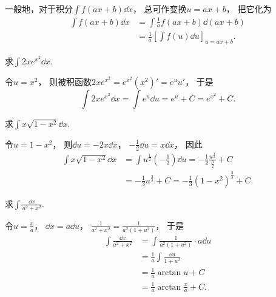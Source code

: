 \begin{remark}
一般地，对于积分\(\int f(ax+b) \dd{x}\)，
总可作变换\(u=ax+b\)，
把它化为\begin{align*}
	\int f(ax+b) \dd{x}
	&= \int \frac{1}{a} f(ax+b) \dd(ax+b) \\
	&= \frac{1}{a} \left[ \int f(u) \dd{u} \right]_{u=ax+b}.
\end{align*}
\end{remark}

\begin{example}
求\(\int 2x e^{x^2} \dd{x}\).
\begin{solution}
令\(u=x^2\)，
则被积函数\(2x e^{x^2} = e^{x^2} (x^2)' = e^u u'\)，
于是\begin{equation*}
	\int 2x e^{x^2} \dd{x}
	= \int e^u \dd{u}
	= e^u + C
	= e^{x^2} + C.
\end{equation*}
\end{solution}
\end{example}

\begin{example}
求\(\int x \sqrt{1-x^2} \dd{x}\).
\begin{solution}
令\(u=1-x^2\)，
则\(\dd{u} = -2x\dd{x}\)，
\(-\frac{1}{2}\dd{u} = x\dd{x}\)，
因此\begin{align*}
	\int x \sqrt{1-x^2} \dd{x}
	&= \int u^{\frac{1}{2}} \left(-\frac{1}{2}\right) \dd{u}
	= -\frac{1}{2} \frac{u^{\frac{3}{2}}}{\frac{3}{2}} + C \\
	&= -\frac{1}{3} u^{\frac{3}{2}} + C
	= -\frac{1}{3} (1-x^2)^{\frac{3}{2}} + C.
\end{align*}
\end{solution}
\end{example}

\begin{example}
求\(\int \frac{\dd{x}}{a^2+x^2}\).
\begin{solution}
令\(u=\frac{x}{a}\)，
\(\dd{x}=a\dd{u}\)，
\(\frac{1}{a^2+x^2}
= \frac{1}{a^2(1+u^2)}\)，
于是\begin{align}
	\int \frac{\dd{x}}{a^2+x^2}
	&= \int \frac{1}{a^2(1+u^2)} \cdot a\dd{u}
		\nonumber \\
	&= \frac{1}{a} \int \frac{\dd{u}}{1+u^2}
		\nonumber \\
	&= \frac{1}{a} \arctan u + C
		\nonumber \\
	&= \frac{1}{a} \arctan\frac{x}{a} + C.
\end{align}
\end{solution}
\end{example}

